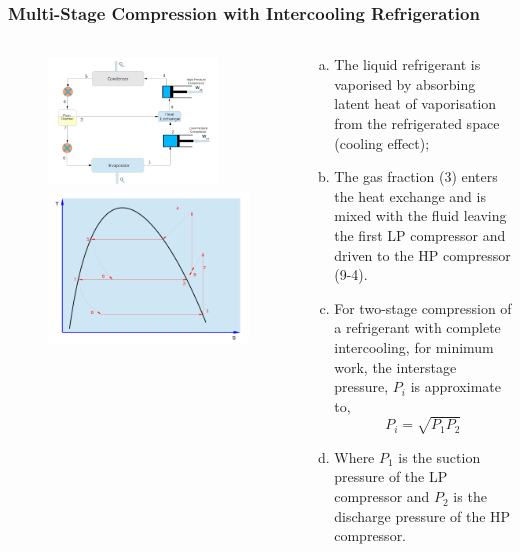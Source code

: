 \documentclass[10pt,compress]{beamer}
\begin{document}
\begin{frame}
 \frametitle{Multi-Stage Compression with Intercooling Refrigeration}
 \begin{columns}
  \begin{column}[c]{0.45\linewidth}
   \begin{figure}%
     \vbox{
      \includegraphics[width=4.5cm,height=3.5cm,clip]{./Pics/Overview_Refrig26}
      \vspace{-.1cm}
      \includegraphics[width=4.cm,height=4.cm,clip]{./Pics/Overview_Refrig27}}
   \end{figure}  
  \end{column}  
  \begin{column}[c]{0.55\linewidth}
   \begin{enumerate}[(a)]
    \item <1-> The liquid refrigerant is vaporised  by absorbing latent heat of vaporisation from the refrigerated space (cooling effect);
    \item <2-> The gas fraction (3) enters the heat exchange and is mixed with the fluid leaving the first LP compressor and driven to the HP compressor (9-4).
    \item <3-> For two-stage compression of a refrigerant with complete intercooling, for minimum work, the interstage pressure, $P_{i}$ is approximate to,
      \begin{displaymath}
       P_{i}=\sqrt{P_{1}P_{2}}
      \end{displaymath}
    \item <4-> Where $P_{1}$ is the suction pressure of the LP compressor and $P_{2}$ is the discharge pressure of the HP compressor.
   \end{enumerate}
  \end{column}  
 \end{columns} 
\end{frame}
\end{document}
